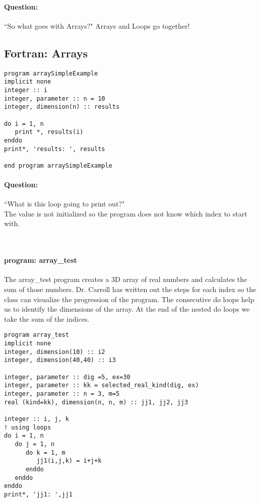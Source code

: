 \documentclass[11pt]{article}
\begin{document}
\paragraph{Question:} ``So what goes with Arrays?"
Arrays and Loops go together!

\subsection{Fortran: Arrays}
\noindent
\begin{minipage}[t]{0.5\textwidth}
\begin{lstlisting}
program arraySimpleExample
implicit none
integer :: i
integer, parameter :: n = 10
integer, dimension(n) :: results

do i = 1, n
   print *, results(i)
enddo
print*, 'results: ', results

end program arraySimpleExample
\end{lstlisting}
	\end{minipage}
\hfill
\begin{minipage}[t]{0.45\textwidth}
\paragraph{Question:}``What is this loop going to print out?"\\

The value is not initialized so the program does not know which index to start with.
\end{minipage}\\

\paragraph{program: array\_test}The array\_test program creates a 3D array of real numbers and calculates the sum of those numbers. Dr. Carroll has written out the steps for each index so the class can visualize the progression of the program. The consecutive do loops help us to identify the dimensions of the array. At the end of the nested do loops we take the sum of the indices.\\

\begin{lstlisting}
program array_test
implicit none
integer, dimension(10) :: i2
integer, dimension(40,40) :: i3

integer, parameter :: dig =5, ex=30
integer, parameter :: kk = selected_real_kind(dig, ex)
integer, parameter :: n = 3, m=5
real (kind=kk), dimension(n, n, m) :: jj1, jj2, jj3

integer :: i, j, k
! using loops
do i = 1, n
   do j = 1, n
      do k = 1, m
         jj1(i,j,k) = i+j+k
      enddo
   enddo
enddo
print*, 'jj1: ',jj1
\end{lstlisting}
\vfill
\end{document}
